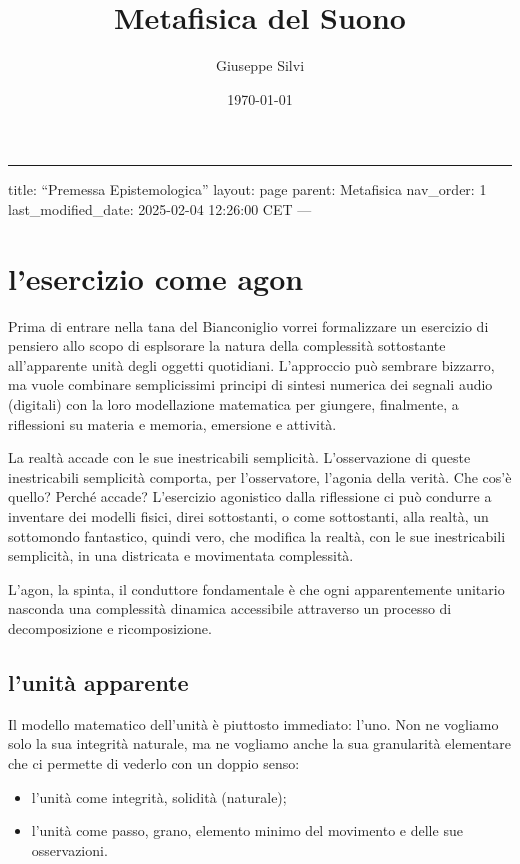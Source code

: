 \documentclass[a4paper,11pt]{article}
\title{Metafisica del Suono}
\author{Giuseppe Silvi}
\date{\today}
\begin{document}
\maketitle

\begin{center}
\rule{3in}{0.4pt}
\end{center}
title: ``Premessa Epistemologica''
layout: page
parent: Metafisica
nav\_order: 1
last\_modified\_date: 2025-02-04 12:26:00 CET
---

\section{l'esercizio come agon}\hypertarget{lesercizio-come-agon}{}\label{lesercizio-come-agon}

Prima di entrare nella tana del Bianconiglio vorrei formalizzare un
esercizio di pensiero allo scopo di esplsorare la natura della
complessità sottostante all'apparente unità degli oggetti quotidiani.
L'approccio può sembrare bizzarro, ma vuole combinare semplicissimi
principi di sintesi numerica dei segnali audio (digitali) con la loro
modellazione matematica per giungere, finalmente, a riflessioni su
materia e memoria, emersione e attività.

La realtà accade con le sue inestricabili semplicità. L'osservazione di
queste inestricabili semplicità comporta, per l'osservatore, l'agonia
della verità. Che cos'è quello? Perché accade? L'esercizio agonistico
dalla riflessione ci può condurre a inventare dei modelli fisici, direi
sottostanti, o come sottostanti, alla realtà, un sottomondo fantastico,
quindi vero, che modifica la realtà, con le sue inestricabili semplicità,
in una districata e movimentata complessità.

L'agon, la spinta, il conduttore fondamentale è che ogni apparentemente
unitario nasconda una complessità dinamica accessibile attraverso un
processo di decomposizione e ricomposizione.

\subsection{l'unità apparente}\hypertarget{lunit-apparente}{}\label{lunit-apparente}

Il modello matematico dell'unità è piuttosto immediato: l'uno. Non ne
vogliamo solo la sua integrità naturale, ma ne vogliamo anche la sua
granularità elementare che ci permette di vederlo con un doppio senso:

\begin{itemize}
\item{} l'unità come integrità, solidità (naturale);
\item{} l'unità come passo, grano, elemento minimo del movimento e delle sue
 osservazioni.
\end{itemize}
\end{document}
